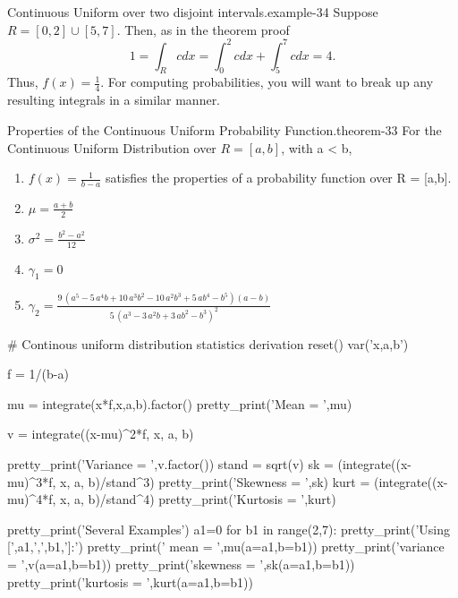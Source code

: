 \documentclass[10pt,]{book}
\numberwithin{equation}{section}
\begin{document}
%
\par
\hypertarget{p-791}{}%
\begin{example}{Continuous Uniform over two disjoint intervals.}{example-34}%
\hypertarget{p-792}{}%
Suppose \(R = [0,2] \cup [5,7]\).  Then, as in the theorem proof%
\begin{equation*}
1 = \int_R c dx = \int_0^2 c dx + \int_5^7 c dx = 4.
\end{equation*}
Thus, \(f(x) = \frac{1}{4}\). For computing probabilities, you will want to break up any resulting integrals in a similar manner.%
\end{example}
%
\par
\hypertarget{p-793}{}%
\begin{theorem}{Properties of the Continuous Uniform Probability Function.}{}{theorem-33}%
\hypertarget{ContinuousUniformProperties}{}%
For the Continuous Uniform Distribution over \(R = [a,b]\), with a < b, \leavevmode%
\begin{enumerate}
\item\hypertarget{li-213}{}\(f(x) = \frac{1}{b-a}\) satisfies the properties of a probability function over R = [a,b].%
\item\hypertarget{li-214}{}\(\mu = \frac{a+b}{2}\)%
\item\hypertarget{li-215}{}\(\sigma^2 = \frac{b^2-a^2}{12}\)%
\item\hypertarget{li-216}{}\(\gamma_1 = 0\)%
\item\hypertarget{li-217}{}\(\gamma_2 = \frac{9 \, {\left(a^{5} - 5 \, a^{4} b + 10 \, a^{3} b^{2} - 10 \, a^{2} b^{3} + 5 \, a b^{4} - b^{5}\right)} {\left(a - b\right)}}{5 \, {\left(a^{3} - 3 \, a^{2} b + 3 \, a b^{2} - b^{3}\right)}^{2}}\)%
\end{enumerate}
%
\end{theorem}
%
\par
\hypertarget{p-795}{}%
\leavevmode%
\begin{sageinput}
# Continous uniform distribution statistics derivation
reset()
var('x,a,b')


f = 1/(b-a)

mu = integrate(x*f,x,a,b).factor()
pretty_print('Mean = ',mu)

v = integrate((x-mu)^2*f, x, a, b)

pretty_print('Variance = ',v.factor())
stand = sqrt(v)
sk = (integrate((x-mu)^3*f, x, a, b)/stand^3)
pretty_print('Skewness =  ',sk)
kurt = (integrate((x-mu)^4*f, x, a, b)/stand^4)
pretty_print('Kurtosis = ',kurt)

pretty_print('Several Examples')
a1=0
for b1 in range(2,7):
    pretty_print('Using [',a1,',',b1,']:')
    pretty_print('    mean = ',mu(a=a1,b=b1))
    pretty_print('variance = ',v(a=a1,b=b1))
    pretty_print('skewness = ',sk(a=a1,b=b1))
    pretty_print('kurtosis = ',kurt(a=a1,b=b1))
\end{sageinput}
\end{document}
